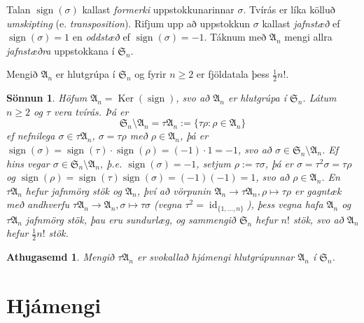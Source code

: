 \documentclass[a4paper,icelandic,11pt]{book}
\theoremstyle{plain}
\newtheorem*{ath}{Athugasemd}
\newtheorem*{sonnun}{Sönnun}
\DeclareMathOperator{\id}{id} %
\DeclareMathOperator{\Ker}{Ker} %
\DeclareMathOperator{\sign}{sign} %
\begin{document}
\begin{skilgr}
  Talan $\sign(\sigma)$ kallast \emph{formerki} uppstokkunarinnar $\sigma$.
  Tvírás er líka kölluð \emph{umskipting} (e. \emph{transposition}). Rifjum
  upp að uppstokkun $\sigma$ kallast \emph{jafnstæð} ef $\sign(\sigma) = 1$ en
  \emph{oddstæð} ef $\sign(\sigma) = -1$. Táknum með $\mathfrak A_n$ mengi
  allra \emph{jafnstæðra} uppstokkana í $\mathfrak S_n$.
\end{skilgr}
\begin{setn}
  Mengið $\mathfrak A_n$ er hlutgrúpa í $\mathfrak S_n$ og fyrir $n\ge 2$ er
  fjöldatala þess $\frac 12 n!$.
\end{setn}
\begin{sonnun}
  Höfum $\mathfrak A_n = \Ker(\sign)$, svo að $\mathfrak A_n$ er hlutgrúpa í
  $\mathfrak S_n$. Látum $n\ge 2$ og $\tau$ vera tvírás. Þá er
  \[
  \mathfrak S_n \setminus \mathfrak A_n 
  = \tau\mathfrak A_n 
  := \{\tau\rho: \rho\in \mathfrak A_n\}
  \]
  ef nefnilega $\sigma \in \tau \mathfrak A_n$, $\sigma = \tau\rho$ með
  $\rho\in \mathfrak A_n$, þá er $\sign(\sigma) = \sign(\tau)\cdot \sign(\rho)
  = (-1)\cdot 1 = -1$, svo að $\sigma\in \mathfrak S_n\setminus \mathfrak
  A_n$. Ef hins vegar $\sigma\in\mathfrak S_n\setminus \mathfrak A_n$, þ.e.
  $\sign(\sigma) = -1$, setjum $\rho := \tau\sigma$, þá er $\sigma = \tau^2
  \sigma = \tau\rho$ og $\sign(\rho) = \sign(\tau)\sign(\sigma) = (-1)(-1) =
  1$, svo að $\rho\in \mathfrak A_n$. En $\tau\mathfrak A_n$ hefur jafnmörg
  stök og $\mathfrak A_n$, því að vörpunin $\mathfrak A_n \to \tau\mathfrak
  A_n, \rho\mapsto \tau\rho$ er gagntæk með andhverfu $\tau\mathfrak A_n \to
  \mathfrak A_n, \sigma\mapsto \tau\sigma$ (vegna $\tau^2 =
  \id_{\{1,\dots,n\}}$), þess vegna hafa $\mathfrak A_n$ og $\tau\mathfrak
  A_n$ jafnmörg stök, þau eru sundurlæg, og sammengið $\mathfrak S_n$ hefur
  $n!$ stök, svo að $\mathfrak A_n$ hefur $\frac 12 n!$ stök.
\end{sonnun}
\begin{ath}
  Mengið $\tau\mathfrak A_n$ er svokallað \emph{hjámengi} hlutgrúpunnar
  $\mathfrak A_n$ í $\mathfrak S_n$.
\end{ath}


\chapter{Hjámengi}
\end{document}
